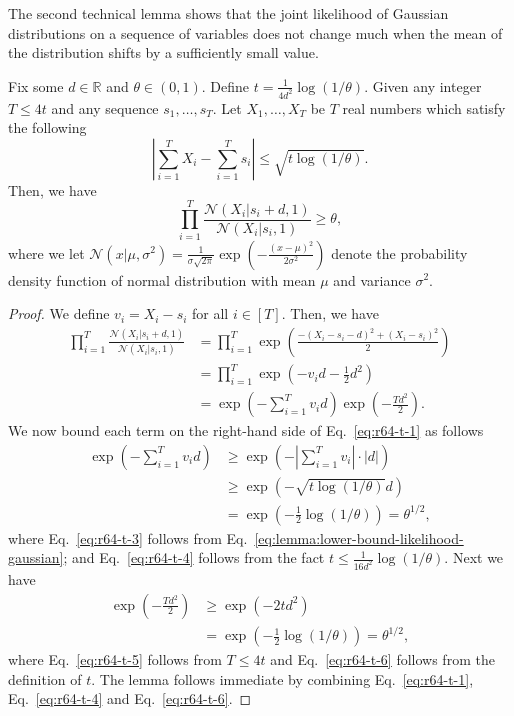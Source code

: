 \documentclass{article}
\newcommand{\RR}{\mathbb R}
\begin{document}
The second technical lemma shows that 
the joint likelihood of Gaussian distributions on a sequence of variables 
does not change much 
when the mean of the distribution shifts by a sufficiently small value.
\begin{lemma}
\label{lemma:lower-bound-likelihood-gaussian}
Fix some $d \in \RR$ and $\theta \in (0,1)$.
Define $t = \frac{1}{4 d^2}\log(1/\theta)$.
Given any integer $T \le 4t$  and any sequence $s_1,\ldots, s_T$.
Let $X_1,\ldots, X_T$ be $T$ real numbers which satisfy the following
\begin{equation}
\label{eq:lemma:lower-bound-likelihood-gaussian}
\left|\sum_{i=1}^T X_i -  \sum_{i=1}^T s_i \right| \le \sqrt{t\log(1/\theta)}.
\end{equation}
Then, we have
$$
\prod_{i=1}^T \frac{\mathcal N(X_i | s_i+d, 1)}{\mathcal N(X_i | s_i, 1)} \ge \theta,
$$
where we let $\mathcal N(x | \mu,\sigma^2)=\frac{1}{\sigma\sqrt{2\pi}}\exp\left(-\frac{(x-\mu)^2}{2\sigma^2}\right)$ 
denote the probability density function of normal distribution with mean $\mu$ and variance $\sigma^2$.
\end{lemma}
\begin{proof}
We define $v_i = X_i-s_i$ for all $i\in [T]$. Then, we have
\begin{align}
  \prod_{i=1}^T \frac{\mathcal N(X_i | s_i+d, 1)}{\mathcal N(X_i | s_i, 1)} 
  &= 
  \prod_{i=1}^{T}
  \exp\left(\frac{-\left(X_i-s_i-d\right)^2+(X_i-s_i)^2}{2}\right) \nonumber \\
  &= 
  \prod_{i=1}^{T}
  \exp\left(- v_i d- \frac{1}{2} d^2 \right) \nonumber\\
  &=
  \exp\left(-\sum_{i=1}^T v_id \right)
  \exp\left(-\frac{Td^2}{2} \right). \label{eq:r64-t-1}
\end{align}
We now bound each term on the right-hand side of Eq.~\eqref{eq:r64-t-1} as follows
\begin{align}
	\exp\left(-\sum_{i=1}^T v_id \right) & \ge \exp\left(-\left|\sum_{i=1}^T v_i \right| \cdot |d| \right)\nonumber\\
																			 & \ge \exp\left(-\sqrt{t\log(1/\theta)} d \right) \label{eq:r64-t-3}\\
																			 & = \exp\left(-\frac12 \log(1/\theta) \right) = \theta^{1/2}, \label{eq:r64-t-4}
\end{align}
where Eq.~\eqref{eq:r64-t-3} follows from Eq.~\eqref{eq:lemma:lower-bound-likelihood-gaussian};
and Eq.~\eqref{eq:r64-t-4} follows from the fact $t \le \frac{1}{16 d^2}\log(1/\theta)$.
Next we have
\begin{align}
	\exp\left(-\frac{Td^2}{2} \right) & \ge \exp\left(-2t d ^2\right) \label{eq:r64-t-5}\\
																		& = \exp\left(-\frac12 \log(1/\theta) \right) = \theta^{1/2},\label{eq:r64-t-6}
\end{align}
where Eq.~\eqref{eq:r64-t-5} follows from $T \le 4t$ and Eq.~\eqref{eq:r64-t-6} follows from the definition of $t$.
The lemma follows immediate by combining Eq.~\eqref{eq:r64-t-1}, Eq.~\eqref{eq:r64-t-4} and Eq.~\eqref{eq:r64-t-6}.
\end{proof}
\end{document}
